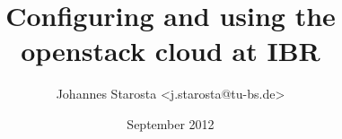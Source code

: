       \title{Configuring and using the openstack cloud at IBR}
\author{Johannes Starosta <j.starosta@tu-bs.de>}
\date{September 2012}
\maketitle
\tableofcontents
